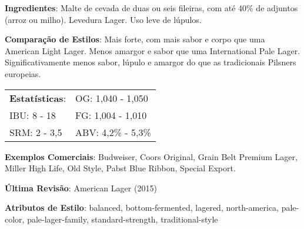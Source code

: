 \textbf{Ingredientes}: Malte de cevada de duas ou seis fileiras, com até 40\% de adjuntos (arroz ou milho). Levedura Lager. Uso leve de lúpulos.

\textbf{Comparação de Estilos}: Mais forte, com mais sabor e corpo que uma American Light Lager. Menos amargor e sabor que uma International Pale Lager. Significativamente menos sabor, lúpulo e amargor do que as tradicionais Pilsners europeias.

\begin{tabular}{@{}p{35mm}p{35mm}@{}}
  \textbf{Estatísticas}: & OG: 1,040 - 1,050 \\
  IBU: 8 - 18  & FG: 1,004 - 1,010 \\
  SRM: 2 - 3,5  & ABV: 4,2\% - 5,3\%
\end{tabular}

\textbf{Exemplos Comerciais}: Budweiser, Coors Original, Grain Belt Premium Lager, Miller High Life, Old Style, Pabst Blue Ribbon, Special Export.

\textbf{Última Revisão}: American Lager (2015)

\textbf{Atributos de Estilo}: balanced, bottom-fermented, lagered, north-america, pale-color, pale-lager-family, standard-strength, traditional-style
